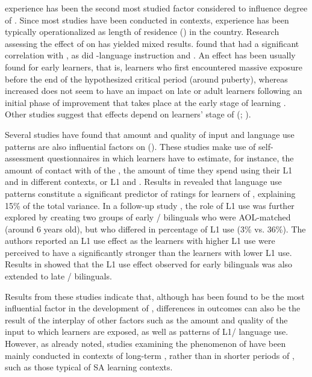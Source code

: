 \documentclass[output=paper]{langsci/langscibook}
\begin{document}
 experience has been the second most studied factor considered to influence degree of . Since most  studies have been conducted in  contexts,  experience has been typically operationalized as length of residence () in the  country. Research assessing the effect of  on   has yielded mixed results. \citet{FlegeFletcher1992} found that  had a significant correlation with , as did -language instruction and . An  effect has been usually found for early  learners, that is, learners who first encountered massive  exposure before the end of the hypothesized critical period (around puberty), whereas increased  does not seem to have an impact on late or adult  learners following an initial phase of improvement that takes place at the early stage of  learning \citep{Flege1988}. Other studies suggest that  effects depend on learners’ stage of   (\citealt{RineyFlege1998}; \citealt{MeadorEtAl2000}).

Several studies have found that amount and quality of  input and language use patterns are also influential factors on   (\citealt{FlegeEtAl1995,FlegeEtAl1997,PiskeEtAl2001}). These studies make use of self-assessment questionnaires in which learners have to estimate, for instance, the amount of contact with  of the , the amount of time they spend using their L1 and  in different contexts, or L1 and  . Results in \citet{FlegeEtAl1995} revealed that language use patterns constitute a significant predictor of  ratings for  learners of  , explaining 15\% of the total variance. In a follow-up study \citep{FlegeEtAl1997}, the role of L1 use was further explored by creating two groups of early / bilinguals who were AOL-matched (around 6 years old), but who differed in percentage of L1 use (3\% vs. 36\%). The authors reported an L1 use effect as the learners with higher L1 use were perceived to have a significantly stronger  than the learners with lower L1 use. Results in \citet{PiskeEtAl2001} showed that the L1 use effect observed for early bilinguals was also extended to late / bilinguals.

Results from these studies indicate that, although  has been found to be the most influential factor in the development of  , differences in   outcomes can also be the result of the interplay of other factors such as the amount and quality of the  input to which learners are exposed, as well as patterns of L1/ language use. However, as already noted, studies examining the phenomenon of  have been mainly conducted in contexts of long-term , rather than in shorter periods of , such as those typical of SA learning contexts.
\end{document}
